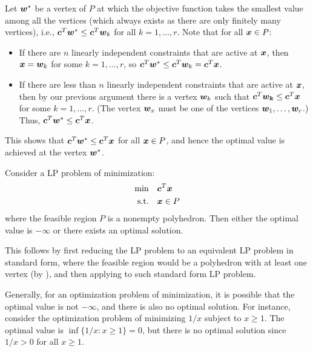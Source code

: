 \begin{enumerate}
\begin{pf}
Let \(\bm{w}^{*}\) be a vertex of \(P\) at which the objective function
takes the smallest value among all the vertices (which always exists as there
are only finitely many vertices), i.e.,
\(\bm{c}^{T}\bm{w}^{*}\le\bm{c}^{T}\bm{w}_k\) for all \(k=1,\dotsc,r\).
Note that for all \(\bm{x}\in P\): 
\begin{itemize}
\item If there are \(n\) linearly independent constraints that are active at
\(\bm{x}\), then \(\bm{x}=\bm{w}_k\) for some \(k=1,\dotsc,r\), so
\(\bm{c}^{T}\bm{w}^*\le\bm{c}^{T}\bm{w}_k=\bm{c}^{T}\bm{x}\).
\item If there are less than \(n\) linearly independent constraints that are
active at \(\bm{x}\), then by our previous argument there is a vertex \(\bm{w}_k\)
such that \(\bm{c}^{T}\bm{w_{k}}\le\bm{c}^{T}\bm{x}\) for some
\(k=1,\dotsc,r\). (The vertex \(\bm{w}_x\) must be one of the vertices
\(\bm{w}_1,\dotsc,\bm{w}_r\).) Thus, \(\bm{c}^{T}\bm{w}^*\le\bm{c}^{T}\bm{x}\).
\end{itemize}
This shows that \(\bm{c}^{T}\bm{w}^*\le\bm{c}^{T}\bm{x}\) for all
\(\bm{x}\in P\), and hence the optimal value is achieved at the vertex
\(\bm{w}^*\).
\end{pf}
\begin{corollary}
\label{cor:lp-optimal-exist}
Consider a LP problem of minimization:
\begin{align*}
\text{min}\quad&\bm{c}^{T}\bm{x} \\
\text{s.t.}\quad&\bm{x}\in P
\end{align*}
where the feasible region \(P\) is a nonempty polyhedron. Then either the
optimal value is \(-\infty\) or there exists an optimal solution.
\end{corollary}
\begin{pf}
This follows by first reducing the LP problem to an equivalent LP problem in
standard form, where the feasible region would be a polyhedron with at least
one vertex (by ), and then applying
 to such standard form LP problem.
\end{pf}

\begin{note}
Generally, for an optimization problem of minimization, it is possible that the
optimal value is not \(-\infty\), and there is also no optimal solution. For
instance, consider the optimization problem of minimizing \(1/x\) subject to
\(x\ge 1\). The optimal value is \(\inf\{1/x:x\ge 1\}=0\), but there is no
optimal solution since \(1/x>0\) for all \(x\ge 1\).
\end{note}
\end{enumerate}

